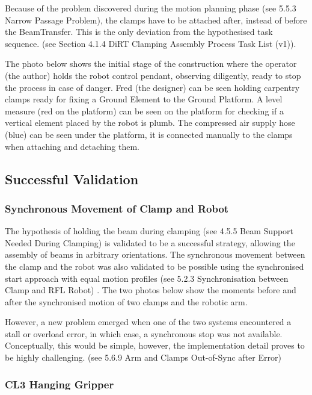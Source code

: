 Because of the problem discovered during the motion planning phase (see 5.5.3 Narrow Passage Problem), the clamps have to be attached after, instead of before the BeamTransfer. This is the only deviation from the hypothesised task sequence. (see Section 4.1.4 DiRT Clamping Assembly Process Task List (v1)). 

The photo below shows the initial stage of the construction where the operator (the author) holds the robot control pendant, observing diligently, ready to stop the process in case of danger. Fred (the designer) can be seen holding carpentry clamps ready for fixing a Ground Element to the Ground Platform. A level measure (red on the platform) can be seen on the platform for checking if a vertical element placed by the robot is plumb. The compressed air supply hose (blue) can be seen under the platform, it is connected manually to the clamps when attaching and detaching them.

\subsection{Successful Validation}
\label{subsection:exploration_2_successful_validation}

\subsubsection{Synchronous Movement of Clamp and Robot}
\label{subsubsection:exploration_2_syncronous_movement_of_clamp_and_robot}

The hypothesis of holding the beam during clamping (see 4.5.5 Beam Support Needed During Clamping) is validated to be a successful strategy, allowing the assembly of beams in arbitrary orientations. The synchronous movement between the clamp and the robot was also validated to be possible using the synchronised start approach with equal motion profiles (see 5.2.3 Synchronisation between Clamp and RFL Robot) . The two photos below show the moments before and after the synchronised motion of two clamps and the robotic arm.
 
However, a new problem emerged when one of the two systems encountered a stall or overload error, in which case, a synchronous stop was not available. Conceptually, this would be simple, however, the implementation detail proves to be highly challenging. (see 5.6.9 Arm and Clamps Out-of-Sync after Error)
\subsubsection{CL3 Hanging Gripper}
\label{subsubsection:exploration_2_cl3_hanging_gripper}

